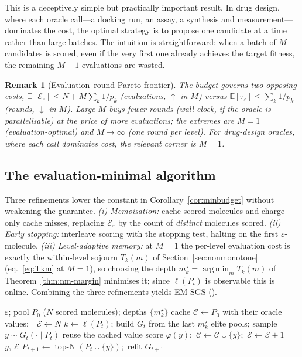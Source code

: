\documentclass[11pt,a4paper]{article}
\newtheorem{remark}[theorem]{Remark}
\newcommand{\E}{\mathbb{E}}
\newcommand{\phist}{\varphi^*}
\DeclareMathOperator{\topN}{top\text{-}N}
\DeclareMathOperator*{\argmin}{arg\,min}
\newcommand{\evals}{\mathcal{E}}
\newcommand{\cache}{\mathcal{C}}
\begin{document}
This is a deceptively simple but practically important result.  In drug
design, where each oracle call---a docking run, an assay, a synthesis and
measurement---dominates the cost, the optimal strategy is to propose one
candidate at a time rather than large batches.  The intuition is
straightforward: when a batch of $M$ candidates is scored, even if the
very first one already achieves the target fitness, the remaining $M-1$
evaluations are wasted.

\begin{remark}[Evaluation--round Pareto frontier]\label{rem:pareto}
  The budget governs two opposing costs,
  $\E[\evals_\varepsilon]\le N+M\sum_k1/p_k$ (evaluations, $\uparrow$ in
  $M$) versus $\E[\tau_\varepsilon]\le\sum_k1/p_k$ (rounds, $\downarrow$ in
  $M$).  Large $M$ buys fewer rounds (wall-clock, if the oracle is
  parallelisable) at the price of more evaluations; the extremes are $M=1$
  (evaluation-optimal) and $M\to\infty$ (one round per level).  For
  drug-design oracles, where each call dominates cost, the relevant corner
  is $M=1$.
\end{remark}

\subsection{The evaluation-minimal algorithm}
\label{sec:ctrl-algo}

Three refinements lower the constant in Corollary~\ref{cor:minbudget} without
weakening the guarantee.  \emph{(i) Memoisation:} cache scored molecules
and charge only cache misses, replacing $\evals_\varepsilon$ by the count
of \emph{distinct} molecules scored.  \emph{(ii) Early stopping:}
interleave scoring with the stopping test, halting on the first
$\varepsilon$-molecule.  \emph{(iii) Level-adaptive memory:} at $M=1$ the
per-level evaluation cost is exactly the within-level sojourn $T_k(m)$ of
Section~\ref{sec:nonmonotone} (eq.~\eqref{eq:Tkm} at $M=1$), so choosing the depth
$m_k^\star=\argmin_m T_k(m)$ of Theorem~\ref{thm:nm-margin} minimises it; since
$\ell(P_t)$ is observable this is online.  Combining the three refinements
yields EM-SGS ().

\begin{algorithm}[ht]
\caption{Evaluation-Minimal Sequential Generative Selection (EM-SGS)}\label{alg:emsgs}
\begin{algorithmic}[1]
\Require $\varepsilon$; pool $P_0$ ($N$ scored molecules); depths $\{m_k^\star\}$
\State cache $\cache\leftarrow P_0$ with their oracle values;\ \ $\evals\leftarrow N$
\Repeat
  \State $k\leftarrow\ell(P_t)$; build $G_t$ from the last $m_k^\star$ elite pools; sample $y\sim G_t(\cdot\mid P_t)$
  \If{$y\in\cache$}
    \State reuse the cached value
  \Else
    \State score $\varphi(y)$;\ $\cache\leftarrow\cache\cup\{y\}$;\ $\evals\leftarrow\evals+1$
  \EndIf
  \If{$\varphi(y)\ge\phist-\varepsilon$}
    \Return $y,\ \evals$ 
  \EndIf
  \State $P_{t+1}\leftarrow\topN(P_t\cup\{y\})$;\ refit $G_{t+1}$
\end{algorithmic}
\end{algorithm}
\end{document}
